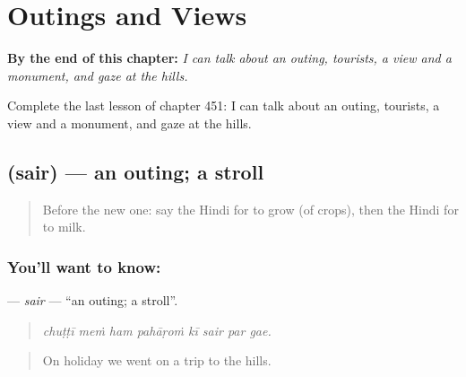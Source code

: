 
\chapter{Outings and Views}
\label{ch:hi-outings-and-views}

\begin{chapteropening}
\textbf{By the end of this chapter:} \emph{I can talk about an outing, tourists, a view and a monument, and gaze at the hills.}

Complete the last lesson of chapter 451: I can talk about an outing, tourists, a view and a monument, and gaze at the hills.
\end{chapteropening}

\section[\texorpdfstring{\hi{सैर} (sair)}{सैर (sair)}]{ (sair) — an outing; a stroll}

\label{lesson:HI-C451-sair}



\begin{quote}
Before the new one: say the Hindi for to grow (of crops), then the Hindi for to milk.
\end{quote}

\subsection*{You'll want to know: }
\textbf{} — \emph{sair} — \textquotedblleft{}an outing; a stroll\textquotedblright{}.

\begin{quote}
       
\end{quote}

\begin{quote}
\emph{chuṭṭī meṁ ham pahāṛoṁ kī sair par gae.}
\end{quote}

\begin{quote}
On holiday we went on a trip to the hills.
\end{quote}

